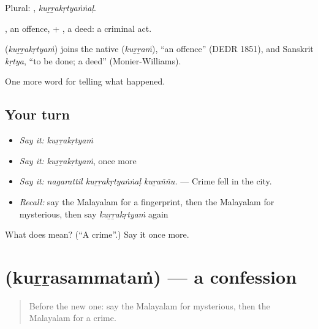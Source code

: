 Plural: , \emph{kuṟṟakṛtyaṅṅaḷ}.

, an offence, + , a deed: a criminal act.

\begin{cousinweb}
\textbf{} (\emph{kuṟṟakṛtyaṁ}) joins the native  (\emph{kuṟṟaṁ}), \textquotedblleft{}an offence\textquotedblright{} (DEDR 1851), and Sanskrit \emph{kṛtya}, \textquotedblleft{}to be done; a deed\textquotedblright{} (Monier-Williams).
\end{cousinweb}

\begin{grammarlens}[title={What you've built}]
One more word for telling what happened.
\end{grammarlens}

\subsection*{Your turn}
\begin{itemize}
\raggedright
  \item \emph{Say it:} \emph{kuṟṟakṛtyaṁ}
  \item \emph{Say it:} \emph{kuṟṟakṛtyaṁ}, once more
  \item \emph{Say it:} \emph{nagarattil kuṟṟakṛtyaṅṅaḷ kuṟaññu.} — Crime fell in the city.
  \item \emph{Recall:} say the Malayalam for a fingerprint, then the Malayalam for mysterious, then say \emph{kuṟṟakṛtyaṁ} again
\end{itemize}

\begin{tcolorbox}[breakable,colback=teal!4,colframe=teal!35!black,title={Before you move on}]
What does  mean? (\textquotedblleft{}A crime\textquotedblright{}.) Say it once more.
\end{tcolorbox}
\section[\texorpdfstring{\ml{കുറ്റസമ്മതം} (kuṟṟasammataṁ)}{കുറ്റസമ്മതം (kuṟṟasammataṁ)}]{ (kuṟṟasammataṁ) — a confession}

\label{lesson:ML-C367-kurrasammatam}



\begin{quote}
Before the new one: say the Malayalam for mysterious, then the Malayalam for a crime.
\end{quote}

